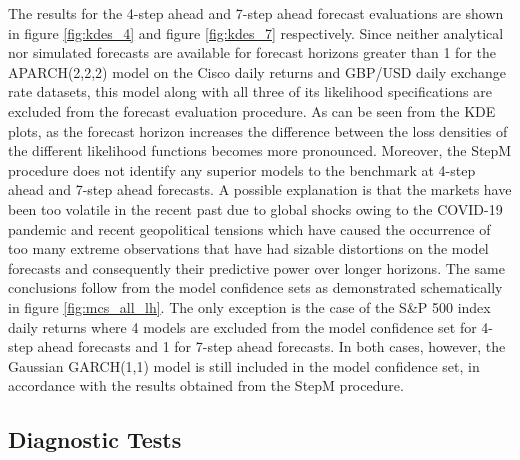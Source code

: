 \documentclass{article} %
\begin{document}
The results for the 4-step ahead and 7-step ahead forecast evaluations are shown in figure \ref{fig:kdes_4} and figure \ref{fig:kdes_7} respectively. Since neither analytical nor simulated forecasts are available for forecast horizons greater than 1 for the APARCH(2,2,2) model on the Cisco daily returns and GBP/USD daily exchange rate datasets, this model along with all three of its likelihood specifications are excluded from the forecast evaluation procedure. As can be seen from the KDE plots, as the forecast horizon increases the difference between the loss densities of the different likelihood functions becomes more pronounced. Moreover, the StepM procedure does not identify any superior models to the benchmark at 4-step ahead and 7-step ahead forecasts. A possible explanation is that the markets have been too volatile in the recent past due to global shocks owing to the COVID-19 pandemic and recent geopolitical tensions which have caused the occurrence of too many extreme observations that have had sizable distortions on the model forecasts and consequently their predictive power over longer horizons. The same conclusions follow from the model confidence sets as demonstrated schematically in figure \ref{fig:mcs_all_lh}. The only exception is the case of the S\&P 500 index daily returns where 4 models are excluded from the model confidence set for 4-step ahead forecasts and 1 for 7-step ahead forecasts. In both cases, however, the Gaussian GARCH(1,1) model is still included in the model confidence set, in accordance with the results obtained from the StepM procedure.

	\subsection{Diagnostic Tests}\label{sec:diagnostics}
\end{document}
